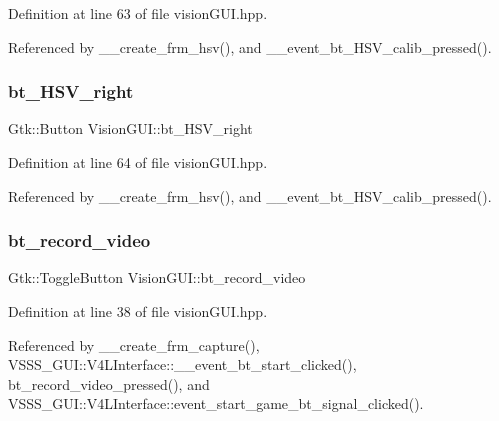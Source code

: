 Definition at line 63 of file vision\+G\+U\+I.\+hpp.



Referenced by \+\_\+\+\_\+create\+\_\+frm\+\_\+hsv(), and \+\_\+\+\_\+event\+\_\+bt\+\_\+\+H\+S\+V\+\_\+calib\+\_\+pressed().

\mbox{\label{class_vision_g_u_i_a3b19593890776c5c77e1a39ac3af627d}} 
\subsubsection{\texorpdfstring{bt\+\_\+\+H\+S\+V\+\_\+right}{bt\_HSV\_right}}
{\footnotesize\ttfamily Gtk\+::\+Button Vision\+G\+U\+I\+::bt\+\_\+\+H\+S\+V\+\_\+right\hspace{0.3cm}{\ttfamily [private]}}



Definition at line 64 of file vision\+G\+U\+I.\+hpp.



Referenced by \+\_\+\+\_\+create\+\_\+frm\+\_\+hsv(), and \+\_\+\+\_\+event\+\_\+bt\+\_\+\+H\+S\+V\+\_\+calib\+\_\+pressed().

\mbox{\label{class_vision_g_u_i_a19751ae6ddc4bef7fcc0edee42820714}} 
\subsubsection{\texorpdfstring{bt\+\_\+record\+\_\+video}{bt\_record\_video}}
{\footnotesize\ttfamily Gtk\+::\+Toggle\+Button Vision\+G\+U\+I\+::bt\+\_\+record\+\_\+video}



Definition at line 38 of file vision\+G\+U\+I.\+hpp.



Referenced by \+\_\+\+\_\+create\+\_\+frm\+\_\+capture(), V\+S\+S\+S\+\_\+\+G\+U\+I\+::\+V4\+L\+Interface\+::\+\_\+\+\_\+event\+\_\+bt\+\_\+start\+\_\+clicked(), bt\+\_\+record\+\_\+video\+\_\+pressed(), and V\+S\+S\+S\+\_\+\+G\+U\+I\+::\+V4\+L\+Interface\+::event\+\_\+start\+\_\+game\+\_\+bt\+\_\+signal\+\_\+clicked().

